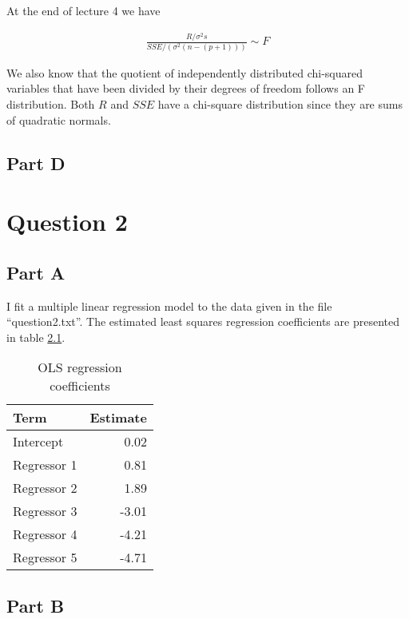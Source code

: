 \documentclass[]{book}
\begin{document}
At the end of lecture 4 we have

\begin{align}
  \frac{R/\sigma^2 s}{SSE/ (\sigma^2 (n - (p + 1)) )} \sim F
\end{align}

We also know that the quotient of independently distributed chi-squared variables that have been divided by their degrees of freedom follows an F distribution. Both \(R\) and \(SSE\) have a chi-square distribution since they are sums of quadratic normals.

\hypertarget{part-d}{%
\section{Part D}\label{part-d}}

\hypertarget{question-2}{%
\chapter{Question 2}\label{question-2}}

\hypertarget{part-a-1}{%
\section{Part A}\label{part-a-1}}

I fit a multiple linear regression model to the data given in the file ``question2.txt''. The estimated least squares regression coefficients are presented in table \ref{tab:coefs}.

\begin{table}

\caption{\label{tab:coefs}OLS regression coefficients}
\centering
\begin{tabular}[t]{lr}
\toprule
Term & Estimate\\
\midrule
Intercept & 0.02\\
Regressor 1 & 0.81\\
Regressor 2 & 1.89\\
Regressor 3 & -3.01\\
Regressor 4 & -4.21\\
Regressor 5 & -4.71\\
\bottomrule
\end{tabular}
\end{table}

\hypertarget{part-b-1}{%
\section{Part B}\label{part-b-1}}
\end{document}
